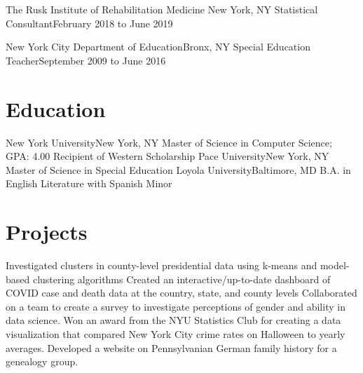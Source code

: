 \documentclass[letterpaper,11pt]{article}
\begin{document}
	\resumeSubheading
	{The Rusk Institute of Rehabilitation Medicine} {New York, NY}
	{Statistical Consultant}{February 2018 to June 2019}
		\resumeItemListStart
		\resumeItemListEnd
	
	\resumeSubheading
	{New York City Department of Education}{Bronx, NY}
	{Special Education Teacher}{September 2009 to June 2016}
		\resumeItemListStart
		\resumeItemListEnd
	\resumeSubHeadingListEnd

\section{Education}
	\resumeSubHeadingListStart
   		\resumeSubheadingAward
      		{New York University}{New York, NY}
      		{Master of Science in Computer Science;  GPA: 4.00}{}
      		{Recipient of Western Scholarship}{}
      	\resumeSubheading
      		{Pace University}{New York, NY}
      		{Master of Science in Special Education} {}
      	\resumeSubheading
      		{Loyola University}{Baltimore, MD}
      		{B.A. in English Literature with Spanish Minor}{}
    \resumeSubHeadingListEnd

\section{Projects}
\resumeItemListStart
				 {Investigated clusters in county-level presidential data using k-means and model-based clustering algorithms}
				 {Created an interactive/up-to-date dashboard of COVID case and death data at the country,  state,  and county levels}
				{Collaborated on a team to create a survey to investigate perceptions of gender and ability in data science.}
				 {Won an award from the NYU Statistics Club for creating a data visualization that compared New York City crime rates on Halloween to yearly averages.}
				{Developed a website on Pennsylvanian German family history for a genealogy group.}
\resumeItemListEnd
\end{document}
